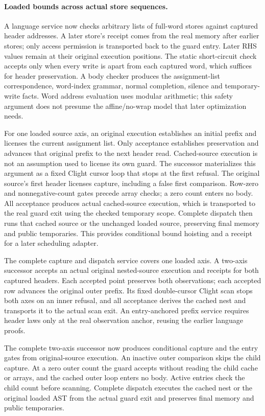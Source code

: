 \paragraph{Loaded bounds across actual store sequences.}
A language service now checks arbitrary lists of full-word stores against
captured header addresses. A later store's receipt comes from the real memory
after earlier stores; only access permission is transported back to the guard
entry. Later RHS values remain at their original execution positions. The
static short-circuit check accepts only when every write is apart from each
captured word, which suffices for header preservation. A body checker produces
the assignment-list correspondence, word-index grammar, normal completion,
silence and temporary-write facts. Word address evaluation uses modular
arithmetic; this safety argument does not presume the affine/no-wrap model
that later optimization needs.

For one loaded source axis, an original execution establishes an initial
prefix and licenses the current assignment list. Only acceptance establishes
preservation and advances that original prefix to the next header read.
Cached-source execution is not an assumption used to license its own guard.
The successor materializes this argument as a fixed Clight cursor loop that
stops at the first refusal. The original source's first header licenses
capture, including a false first comparison. Row-zero and nonnegative-count
gates precede array checks; a zero count enters no body. All acceptance
produces actual cached-source execution, which is transported to the real
guard exit using the checked temporary scope. Complete dispatch then runs
that cached source or the unchanged loaded source, preserving final memory
and public temporaries. This provides conditional bound hoisting and a receipt
for a later scheduling adapter.

The complete capture and dispatch service covers one loaded axis. A two-axis
successor accepts an actual original nested-source execution and receipts for
both captured headers. Each accepted point preserves both observations; each
accepted row advances the original outer prefix. Its fixed double-cursor
Clight scan stops both axes on an inner refusal, and all acceptance derives
the cached nest and transports it to the actual scan exit. An entry-anchored
prefix service requires header laws only at the real observation anchor,
reusing the earlier language proofs.

The complete two-axis successor now produces conditional capture and the
entry gates from original-source execution. An inactive outer comparison
skips the child capture. At a zero outer count the guard accepts without
reading the child cache or arrays, and the cached outer loop enters no body.
Active entries check the child count before scanning. Complete dispatch
executes the cached nest or the original loaded AST from the actual guard
exit and preserves final memory and public temporaries.

